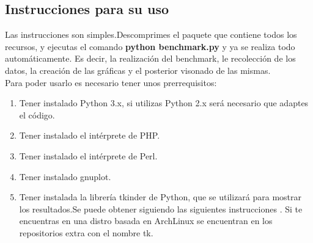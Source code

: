 \subsection{Instrucciones para su uso}
Las instrucciones son simples.Descomprimes el paquete que contiene todos los recursos, y ejecutas el comando \textbf{python benchmark.py} y ya se realiza todo automáticamente. Es decir, la realización del benchmark, le recolección de los datos, la creación de las gráficas y el posterior visonado de las mismas.\\
Para poder usarlo es necesario tener unos prerrequisitos: 
\begin{enumerate}
	\item Tener instalado Python 3.x, si utilizas Python 2.x será necesario que adaptes el código.
	\item Tener instalado el intérprete de PHP.
	\item Tener instalado el intérprete de Perl.
	\item Tener instalado gnuplot.
	\item Tener instalada la librería tkinder de Python, que se utilizará para mostrar los resultados.Se puede obtener siguiendo las siguientes instrucciones \cite{tk}. Si te encuentras en una distro basada en ArchLinux se encuentran en los repositorios extra con el nombre tk.
\end{enumerate}
